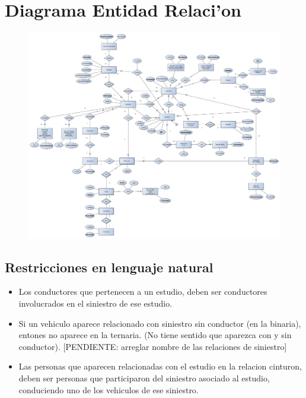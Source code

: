 \section{Diagrama Entidad Relaci'on}

\begin{figure}[H]
	\begin{center}
		\includegraphics[scale=0.2]{imagenes/DER.pdf}
	\end{center}
\end{figure}

\subsection{Restricciones en lenguaje natural}

\begin{itemize}
\item Los conductores que pertenecen a un estudio, deben ser conductores involucrados en el siniestro de ese estudio.
\item Si un vehiculo aparece relacionado con siniestro sin conductor (en la binaria), entones no aparece en la ternaria. (No tiene sentido que aparezca con y sin conductor). [PENDIENTE: arreglar nombre de las relaciones de siniestro]
\item Las personas que aparecen relacionadas con el estudio en la relacion cinturon, deben ser personas que participaron del siniestro asociado al estudio, conduciendo uno de los vehiculos de ese siniestro.
\end{itemize}
